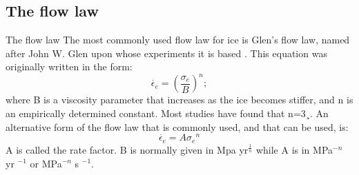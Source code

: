 \documentclass[11pt]{beamer}
\begin{document}
	\subsection{The flow law}
		\begin{frame}{The flow law}
			\justifying
			The most commonly used ﬂow law for ice is Glen’s ﬂow law, named after John W. Glen upon whose experiments it is based \cite{glen1958flow}. This equation was originally written in the form:
			\begin{equation}
				\dot{\epsilon_{e}}=({\frac{\sigma_{e}}{B}})^n;
			\end{equation}
			where B is a viscosity parameter that increases as the ice becomes stiffer, and n is an empirically determined constant. Most studies have found that n=3¸. An alternative form of the ﬂow law that is commonly used, and that can be used, is:
			\begin{equation}
				\dot{\epsilon_{e}}=A{\sigma_{e}}^n
			\end{equation}
			A is called the rate factor. B is normally given in Mpa yr$^{\frac{1}{n}}$ while A is in MPa$^{-n}$ yr $^{-1}$ or MPa$^{-n}$ s $^{-1}$.
		\end{frame}
\end{document}

